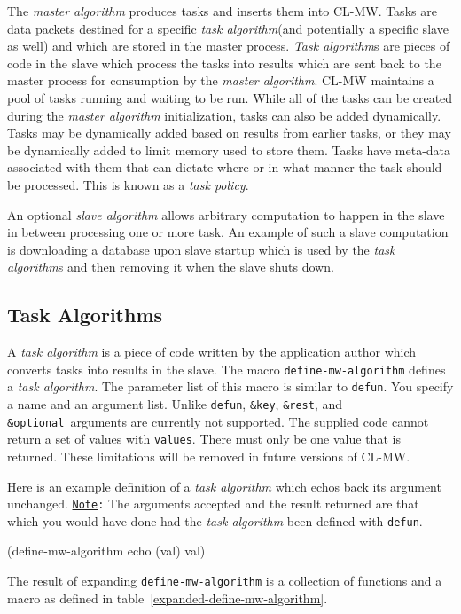\documentclass[titlepage,12pt]{book}
\newcommand{\xsmall}{\latexhtml{\small}{}}
\newcommand{\xnormalsize}{\latexhtml{\normalsize}{}}
\newcommand{\clmw}{\xsmall\textsc{CL-MW}\xnormalsize\xspace}
\newcommand{\sa}{\textit{slave algorithm}\xspace}
\newcommand{\ma}{\textit{master algorithm}\xspace}
\newcommand{\ta}{\textit{task algorithm}\xspace}
\newcommand{\tas}{\textit{task algorithm}s\xspace}
\newcommand{\Tas}{\textit{Task algorithm}s\xspace}
\newcommand{\tp}{\textit{task policy}\xspace}
\newcommand{\func}[1]{\mbox{\texttt{#1}}\xspace}
\newcommand{\macro}[1]{\mbox{\texttt{#1}}\xspace}
\newcommand{\key}{\texttt{\&key}\xspace}
\newcommand{\rest}{\texttt{\&rest}\xspace}
\newcommand{\optional}{\texttt{\&optional}\xspace}
\newcommand{\Note}{\texttt{\underline{Note}:}\xspace}
\begin{document}
The \ma produces tasks and inserts them into \clmw.  Tasks are data
packets destined for a specific \ta (and potentially a specific slave
as well) and which are stored in the master process.  \Tas are pieces
of code in the slave which process the tasks into results which
are sent back to the master process for consumption by the \ma.
\clmw maintains a pool of tasks running and waiting to be run.
While all of the tasks can be created during the \ma initialization,
tasks can also be added dynamically.  Tasks may be dynamically added
based on results from earlier tasks, or they may be dynamically added
to limit memory used to store them.  Tasks have meta-data associated
with them that can dictate where or in what manner the task should
be processed. This is known as a \tp.

An optional \sa allows arbitrary computation to happen in the slave
in between processing one or more task. An example of such a slave
computation is downloading a database upon slave startup which is
used by the \tas and then removing it when the slave shuts down.

\subsection{Task Algorithms}

A \ta is a piece of code written by the application author
which converts tasks into results in the slave.  The macro
\macro{define-mw-algorithm} defines a \ta. The parameter list of
this macro is similar to \macro{defun}. You specify a name and an
argument list. Unlike \macro{defun}, \key, \rest, and \optional\
arguments are currently not supported. The supplied code cannot return
a set of values with \func{values}. There must only be one value that
is returned.  These limitations will be removed in future versions
of \clmw.

Here is an example definition of a \ta which echos back its argument
unchanged. \Note The arguments accepted and the result returned
are that which you would have done had the \ta been defined with
\macro{defun}.

\begin{lisp}[caption=The \texttt{echo} Task Algorithm]
(define-mw-algorithm echo (val)
	val)
\end{lisp}

The result of expanding \macro{define-mw-algorithm} is a collection of
functions and a macro as defined in table~\ref{expanded-define-mw-algorithm}.
\end{document}
